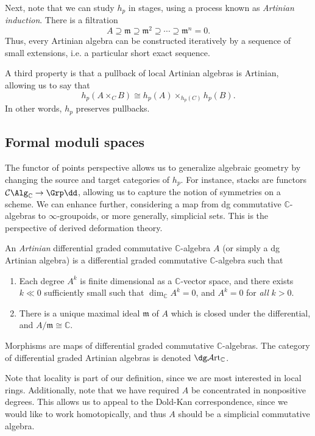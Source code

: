 Next, note that we can study $h_p$ in stages, using a process known as \emph{Artinian induction}. There is a filtration
\[
	A \supseteq \mathfrak{m} \supseteq \mathfrak{m} ^2\supseteq \cdots \supseteq \mathfrak{m} ^n= 0
.\]
Thus, every Artinian algebra can be constructed iteratively by a sequence of small extensions, i.e. a particular short exact sequence.

A third property is that a pullback of local Artinian algebras is Artinian, allowing us to say that
\[
	h_p(A\times_CB)\cong h_p(A)\times_{h_p(C)} h_p(B)
.\]
In other words, $h_p$ preserves pullbacks.

\subsection{Formal moduli spaces}

The functor of points perspective allows us to generalize algebraic geometry by changing the source and target categories of $h_p$. For instance, stacks are functors $\mathcal{C} \Alg_{\mathbb{C} } \to \Grp\dd$, allowing us to capture the notion of symmetries on a scheme. We can enhance further, considering a map from dg commutative $\mathbb{C} $-algebras to $\infty $-groupoids, or more generally, simplicial sets. This is the perspective of derived deformation theory.

\begin{definition}\label{dfn:10-2-3}
	An \emph{Artinian} differential graded commutative $\mathbb{C}$-algebra $A$ (or simply a dg Artinian algebra) is a differential graded commutative $\mathbb{C} $-algebra such that
	\begin{enumerate}
		\item Each degree $A^k$ is finite dimensional as a $\mathbb{C} $-vector space, and there exists $k \ll 0$ sufficiently small such that $\dim_{\mathbb{C} } A^k=0$, and $A^k=0$ for \emph{all} $k>0$.
		\item There is a unique maximal ideal $\mathfrak{m} $ of $A$ which is closed under the differential, and $A / \mathfrak{m} \cong \mathbb{C} $.
	\end{enumerate}
	Morphisms are maps of differential graded commutative $\mathbb{C} $-algebras. The category of differential graded Artinian algebras is denoted $\dg \mathcal{A} \mathrm{rt}_{\mathbb{C}} $.
\end{definition}
Note that locality is part of our definition, since we are most interested in local rings. Additionally, note that we have required $A$ be concentrated in nonpositive degrees. This allows us to appeal to the Dold-Kan correspondence, since we would like to work homotopically, and thus $A$ should be a simplicial commutative algebra.

